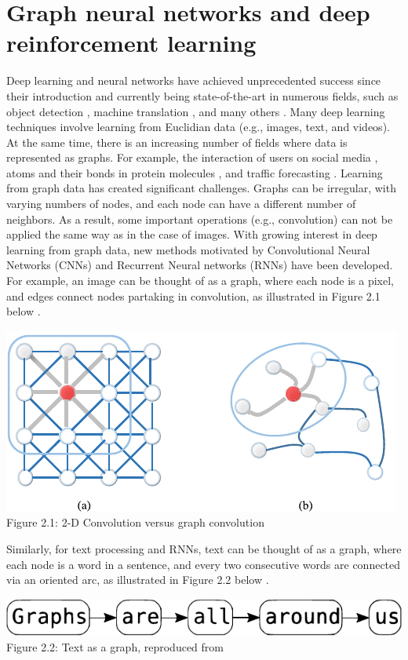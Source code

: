 \chapter{Graph neural networks and deep reinforcement learning}
\label{chap:math}

Deep learning and neural networks have achieved unprecedented success since their introduction and currently being state-of-the-art in numerous fields, such as object detection \cite{DBLP:journals/corr/RedmonDGF15, 10.1109/IVS.2019.8813777, 8627998}, machine translation \cite{DBLP:journals/corr/LuongPM15, 8003957, DBLP:journals/corr/abs-2002-07526}, and many others \cite{DONG2021100379, 10.1145/3505243, PICCIALLI2021111}. Many deep learning techniques involve learning from Euclidian data (e.g., images, text, and videos). At the same time, there is an increasing number of fields where data is represented as graphs. For example, the interaction of users on social media \cite{10.1145/3308558.3313488}, atoms and their bonds in protein molecules \cite{strokach2020fast}, and traffic forecasting \cite{JIANG2022117921}. Learning from graph data has created significant challenges. Graphs can be irregular, with varying numbers of nodes, and each node can have a different number of neighbors. As a result, some important operations (e.g., convolution) can not be applied the same way as in the case of images. With growing interest in deep learning from graph data, new methods motivated by Convolutional Neural Networks (CNNs) and Recurrent Neural networks (RNNs) have been developed. For example, an image can be thought of as a graph, where each node is a pixel, and edges connect nodes partaking in convolution, as illustrated in Figure 2.1 below \cite{9046288}.\\
\begin{center}
    \includegraphics[width=0.6\linewidth]{images/image_vs_graph.pdf}\\
    Figure 2.1: 2-D Convolution versus graph convolution \cite{9046288}
\end{center}
\newpage
Similarly, for text processing and RNNs, text can be thought of as a graph, where each node is a word in a sentence, and every two consecutive words are connected via an oriented arc, as illustrated in Figure 2.2 below \cite{sanchez-lengeling2021a}.
\begin{center}
    \includegraphics[width=0.7\linewidth]{images/graph_are_all_around_us.pdf}\\
    Figure 2.2: Text as a graph, reproduced from \cite{sanchez-lengeling2021a}
\end{center}

